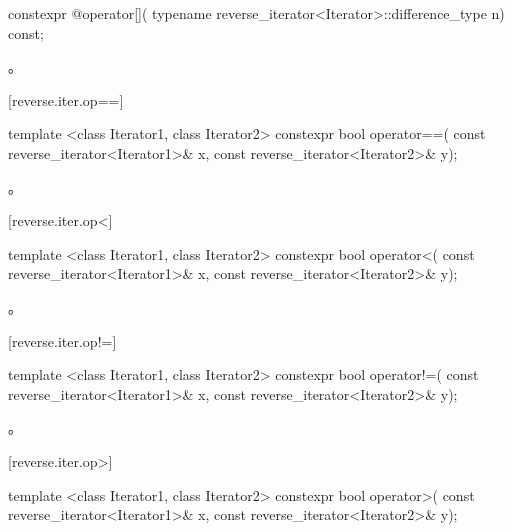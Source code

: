 %
\begin{itemdecl}
constexpr @\unspec@ operator[](
    typename reverse_iterator<Iterator>::difference_type n) const;
\end{itemdecl}

\begin{itemdescr}
\pnum
\returns
{}。
\end{itemdescr}

[reverse.iter.op==]{}

%
\begin{itemdecl}
template <class Iterator1, class Iterator2>
  constexpr bool operator==(
    const reverse_iterator<Iterator1>& x,
    const reverse_iterator<Iterator2>& y);
\end{itemdecl}

\begin{itemdescr}
\pnum
\returns
{}。
\end{itemdescr}

[reverse.iter.op<]{}

%
\begin{itemdecl}
template <class Iterator1, class Iterator2>
  constexpr bool operator<(
    const reverse_iterator<Iterator1>& x,
    const reverse_iterator<Iterator2>& y);
\end{itemdecl}

\begin{itemdescr}
\pnum
\returns
{}。
\end{itemdescr}

[reverse.iter.op!=]{}

%
\begin{itemdecl}
template <class Iterator1, class Iterator2>
  constexpr bool operator!=(
    const reverse_iterator<Iterator1>& x,
    const reverse_iterator<Iterator2>& y);
\end{itemdecl}

\begin{itemdescr}
\pnum
\returns
{}。
\end{itemdescr}

[reverse.iter.op>]{}

%
\begin{itemdecl}
template <class Iterator1, class Iterator2>
  constexpr bool operator>(
    const reverse_iterator<Iterator1>& x,
    const reverse_iterator<Iterator2>& y);
\end{itemdecl}

